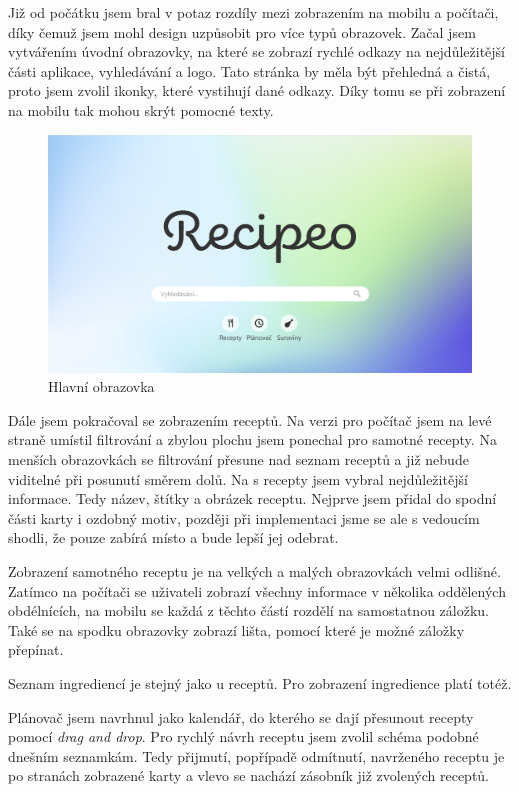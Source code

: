 Již od počátku jsem bral v potaz rozdíly mezi zobrazením na mobilu a počítači, díky čemuž jsem mohl design uzpůsobit
pro více typů obrazovek. Začal jsem vytvářením úvodní obrazovky, na které se zobrazí rychlé odkazy na nejdůležitější části
aplikace, vyhledávání a logo. Tato stránka by měla být přehledná a čistá, proto jsem zvolil ikonky, které vystihují dané
odkazy. Díky tomu se při zobrazení na mobilu tak mohou skrýt pomocné texty.

\begin{figure}
    \includegraphics[width=\textwidth]{images/main-page}
    \caption{Hlavní obrazovka} \label{picture:recipeo:main-page}
\end{figure}

Dále jsem pokračoval se zobrazením receptů. Na verzi pro počítač jsem na levé straně umístil filtrování a zbylou plochu jsem ponechal
pro samotné recepty. Na menších obrazovkách se filtrování přesune nad seznam receptů a již nebude viditelné při posunutí směrem dolů.
Na  s recepty jsem vybral nejdůležitější informace. Tedy název, štítky a obrázek receptu. Nejprve jsem přidal do spodní části
karty i ozdobný motiv, později při implementaci jsme se ale s vedoucím shodli, že pouze zabírá místo a bude lepší jej odebrat.

Zobrazení samotného receptu je na velkých a malých obrazovkách velmi odlišné. Zatímco na počítači se uživateli zobrazí všechny
informace v několika oddělených obdélnících, na mobilu se každá z těchto částí rozdělí na samostatnou záložku. Také se na spodku
obrazovky zobrazí lišta, pomocí které je možné záložky přepínat.

Seznam ingrediencí je stejný jako u receptů. Pro zobrazení ingredience platí totéž.

Plánovač jsem navrhnul jako kalendář, do kterého se dají přesunout recepty pomocí \emph{drag and drop}. Pro rychlý návrh receptu
jsem zvolil schéma podobné dnešním seznamkám. Tedy přijmutí, popřípadě odmítnutí, navrženého receptu je po stranách zobrazené karty
a vlevo se nachází zásobník již zvolených receptů.


